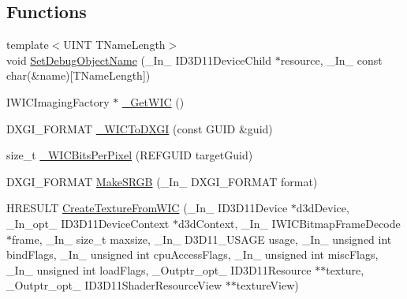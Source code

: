 \subsection*{Functions}
\begin{DoxyCompactItemize}
\item 
{\footnotesize template$<$U\+I\+NT T\+Name\+Length$>$ }\\void \mbox{\hyperlink{namespaceanonymous__namespace_02wic__loader_8cpp_03_a97d4d9faf956efc69b5a3e9f05d8474c}{Set\+Debug\+Object\+Name}} (\+\_\+\+In\+\_\+ I\+D3\+D11\+Device\+Child $\ast$resource, \+\_\+\+In\+\_\+ const char(\&name)\mbox{[}T\+Name\+Length\mbox{]})
\item 
I\+W\+I\+C\+Imaging\+Factory $\ast$ \mbox{\hyperlink{namespaceanonymous__namespace_02wic__loader_8cpp_03_a823769822c5351da1d61aad70cd3d4b3}{\+\_\+\+Get\+W\+IC}} ()
\item 
D\+X\+G\+I\+\_\+\+F\+O\+R\+M\+AT \mbox{\hyperlink{namespaceanonymous__namespace_02wic__loader_8cpp_03_ad19dbd104f6014e9f40956c1db4b6d6c}{\+\_\+\+W\+I\+C\+To\+D\+X\+GI}} (const G\+U\+ID \&guid)
\item 
size\+\_\+t \mbox{\hyperlink{namespaceanonymous__namespace_02wic__loader_8cpp_03_a567b0e96d3bcaf49f962aeebaaf6ea3a}{\+\_\+\+W\+I\+C\+Bits\+Per\+Pixel}} (R\+E\+F\+G\+U\+ID target\+Guid)
\item 
D\+X\+G\+I\+\_\+\+F\+O\+R\+M\+AT \mbox{\hyperlink{namespaceanonymous__namespace_02wic__loader_8cpp_03_ac45d001476239afc908a943be5b73132}{Make\+S\+R\+GB}} (\+\_\+\+In\+\_\+ D\+X\+G\+I\+\_\+\+F\+O\+R\+M\+AT format)
\item 
H\+R\+E\+S\+U\+LT \mbox{\hyperlink{namespaceanonymous__namespace_02wic__loader_8cpp_03_ac3d786a250fdee3229f0edf9d00a86a0}{Create\+Texture\+From\+W\+IC}} (\+\_\+\+In\+\_\+ I\+D3\+D11\+Device $\ast$d3d\+Device, \+\_\+\+In\+\_\+opt\+\_\+ I\+D3\+D11\+Device\+Context $\ast$d3d\+Context, \+\_\+\+In\+\_\+ I\+W\+I\+C\+Bitmap\+Frame\+Decode $\ast$frame, \+\_\+\+In\+\_\+ size\+\_\+t maxsize, \+\_\+\+In\+\_\+ D3\+D11\+\_\+\+U\+S\+A\+GE usage, \+\_\+\+In\+\_\+ unsigned int bind\+Flags, \+\_\+\+In\+\_\+ unsigned int cpu\+Access\+Flags, \+\_\+\+In\+\_\+ unsigned int misc\+Flags, \+\_\+\+In\+\_\+ unsigned int load\+Flags, \+\_\+\+Outptr\+\_\+opt\+\_\+ I\+D3\+D11\+Resource $\ast$$\ast$texture, \+\_\+\+Outptr\+\_\+opt\+\_\+ I\+D3\+D11\+Shader\+Resource\+View $\ast$$\ast$texture\+View)
\end{DoxyCompactItemize}
